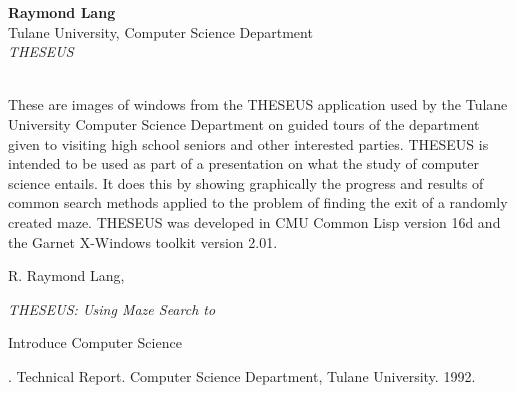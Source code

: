 \newpage{}

\begin{center}
\end{center}
\begin{center}
\end{center}
\begin{center}
\end{center}
\begin{tabular}
{\bf Raymond Lang}\\
Tulane University, Computer Science Department\\
{\it THESEUS}\\
\\
\end{tabular}

These are images of windows from the
THESEUS application used by the Tulane University Computer Science
Department on guided tours of the department given to visiting high
school seniors and other interested parties.  THESEUS is intended to
be used as part of a presentation on what the study of computer
science entails.  It does this by showing graphically the progress and
results of common search methods applied to the problem of finding the
exit of a randomly created maze.  THESEUS was developed in CMU Common
Lisp version 16d and the Garnet X-Windows toolkit version 2.01.

\begin{description}
R. Raymond Lang, {\it THESEUS: Using Maze Search to
\item[] Introduce Computer Science}.  Technical Report.  Computer Science
Department, Tulane University. 1992.
\end{description}

\newpage{}

